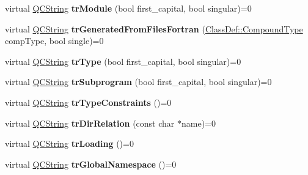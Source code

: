 \begin{DoxyCompactItemize}
\item 
\hypertarget{class_translator_a9384a6e2a58cebef49b198d6ddf8fdae}{virtual \hyperlink{class_q_c_string}{Q\-C\-String} {\bfseries tr\-Module} (bool first\-\_\-capital, bool singular)=0}\label{class_translator_a9384a6e2a58cebef49b198d6ddf8fdae}

\item 
\hypertarget{class_translator_ac1d6607ef618a0e29f481a8bb042cbd7}{virtual \hyperlink{class_q_c_string}{Q\-C\-String} {\bfseries tr\-Generated\-From\-Files\-Fortran} (\hyperlink{class_class_def_a768a6f0a6fd7e9087ff7971abbcc3f36}{Class\-Def\-::\-Compound\-Type} comp\-Type, bool single)=0}\label{class_translator_ac1d6607ef618a0e29f481a8bb042cbd7}

\item 
\hypertarget{class_translator_a6c8d3a8b9ff35aeccdd33ed6ad7b1a27}{virtual \hyperlink{class_q_c_string}{Q\-C\-String} {\bfseries tr\-Type} (bool first\-\_\-capital, bool singular)=0}\label{class_translator_a6c8d3a8b9ff35aeccdd33ed6ad7b1a27}

\item 
\hypertarget{class_translator_a565d6ef204cf23f6e1170e9eb98cf201}{virtual \hyperlink{class_q_c_string}{Q\-C\-String} {\bfseries tr\-Subprogram} (bool first\-\_\-capital, bool singular)=0}\label{class_translator_a565d6ef204cf23f6e1170e9eb98cf201}

\item 
\hypertarget{class_translator_a908aaf82dac435ad4d1b2207d78bee0e}{virtual \hyperlink{class_q_c_string}{Q\-C\-String} {\bfseries tr\-Type\-Constraints} ()=0}\label{class_translator_a908aaf82dac435ad4d1b2207d78bee0e}

\item 
\hypertarget{class_translator_a9ce4be35d5395414127883579dbf3a63}{virtual \hyperlink{class_q_c_string}{Q\-C\-String} {\bfseries tr\-Dir\-Relation} (const char $\ast$name)=0}\label{class_translator_a9ce4be35d5395414127883579dbf3a63}

\item 
\hypertarget{class_translator_a399c362948b3ed1e4e6dd25219d5c653}{virtual \hyperlink{class_q_c_string}{Q\-C\-String} {\bfseries tr\-Loading} ()=0}\label{class_translator_a399c362948b3ed1e4e6dd25219d5c653}

\item 
\hypertarget{class_translator_af234a109a104045527a463fba62ec8b0}{virtual \hyperlink{class_q_c_string}{Q\-C\-String} {\bfseries tr\-Global\-Namespace} ()=0}\label{class_translator_af234a109a104045527a463fba62ec8b0}


\end{DoxyCompactItemize}
